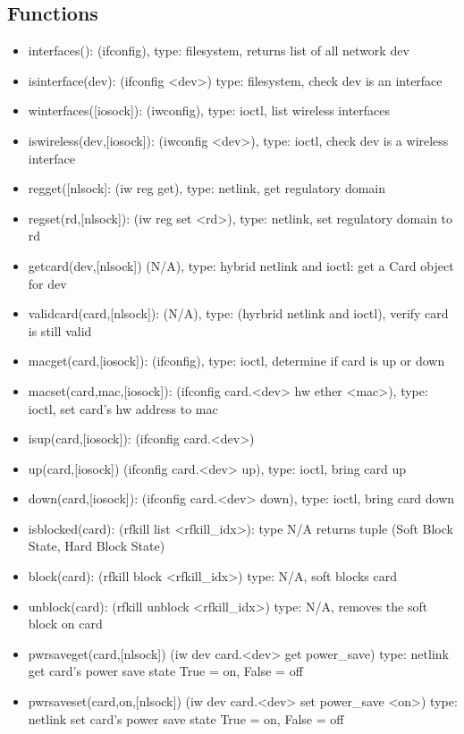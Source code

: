 \documentclass[11pt]{article}
\begin{document}
\begin{appendices}
\subsection{Functions}
\begin{itemize}
\item interfaces(): (ifconfig), type: filesystem, returns list of all network dev
\item isinterface(dev): (ifconfig <dev>) type: filesystem, check dev is an interface
\item winterfaces([iosock]): (iwconfig), type: ioctl, list wireless interfaces
\item iswireless(dev,[iosock]): (iwconfig <dev>), type: ioctl, check dev is a 
wireless interface
\item regget([nlsock]: (iw reg get), type: netlink, get regulatory domain
\item regset(rd,[nlsock]): (iw reg set <rd>), type: netlink, set regulatory domain 
to rd
\item getcard(dev,[nlsock]) (N/A), type: hybrid netlink and ioctl: get a Card 
object for dev
\item validcard(card,[nlsock]): (N/A), type: (hyrbrid netlink and ioctl), verify
card is still valid
\item macget(card,[iosock]): (ifconfig), type: ioctl, determine if card is up
or down
\item macset(card,mac,[iosock]): (ifconfig card.<dev> hw ether <mac>), type: 
ioctl, set card's hw address to mac
\item isup(card,[iosock]): (ifconfig card.<dev>) 
\item up(card,[iosock]) (ifconfig card.<dev> up), type: ioctl, bring card up
\item down(card,[iosock]): (ifconfig card.<dev> down), type: ioctl, bring card 
down
\item isblocked(card): (rfkill list <rfkill\_idx>): type N/A returns tuple 
(Soft Block State, Hard Block State) 
\item block(card): (rfkill block <rfkill\_idx>) type: N/A, soft blocks card
\item unblock(card): (rfkill unblock <rfkill\_idx>) type: N/A, removes the soft 
block on card
\item pwrsaveget(card,[nlsock]) (iw dev card.<dev> get power\_save) type: netlink
get card's power save state True = on, False = off
\item pwrsaveset(card,on,[nlsock]) (iw dev card.<dev> set power\_save <on>) type:
netlink set card's power save state True = on, False = off

\end{itemize}
\end{appendices}
\end{document}
